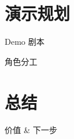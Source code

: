 \documentclass[10pt]{beamer}
\begin{document}
\section{演示规划}
\begin{frame}{Demo 剧本}
\end{frame}
\begin{frame}{角色分工}
\end{frame}

\section{总结}
\begin{frame}{价值 \& 下一步}
\end{frame}
\end{document}
